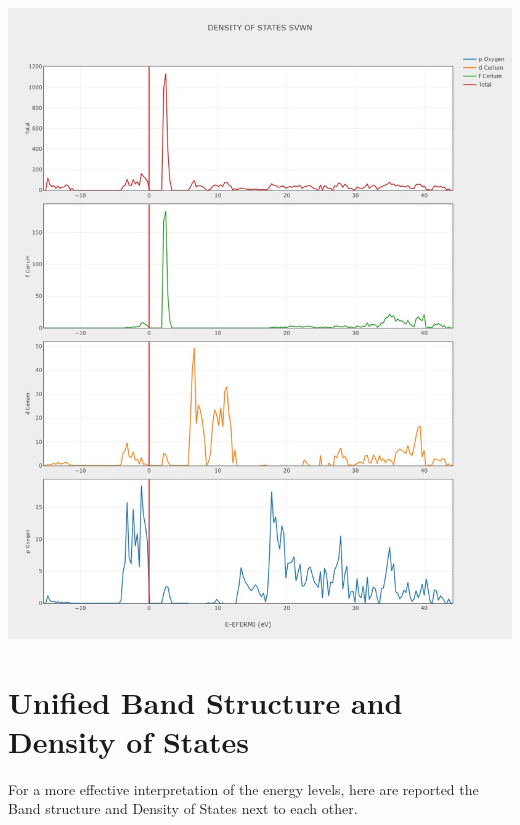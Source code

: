 \documentclass{article}
\begin{document}
\begin{minipage}{0.49\textwidth}
	\centering
	\includegraphics[width=1\textwidth]{../images/correct_band_and_dos/DOS SVWN.jpeg}
    \label{fig:DOS_SVWN}
\end{minipage}

\newpage
\section{Unified Band Structure and Density of States}

For a more effective interpretation of the energy levels, here are reported the Band structure and Density of States next to each other.

\vspace{15pt}
\end{document}
